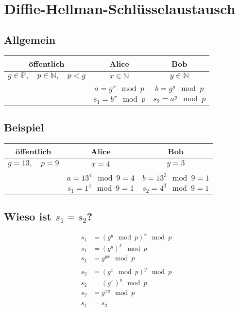 \documentclass[a4paper]{report}
\begin{document}
\chapter*{Diffie-Hellman-Schlüsselaustausch}
\section*{Allgemein}
\begin{center}
\begin{tabular}{c|c|c}
    öffentlich & Alice & Bob \\
    \hline
    $g\in\mathbb{P},\quad p\in\mathbb{N},\quad p<g$ &
    $x\in\mathbb{N}$ &
    $y\in\mathbb{N}$ \\ & & \\
    &
    $a=g^x \mod p$ &
    $b=g^y \mod p$ \\
    & $s_1=b^x \mod p$ & $s_2=a^y \mod p$
\end{tabular}
\end{center}

\section*{Beispiel}
\begin{center}
\begin{tabular}{c|c|c}
    öffentlich & Alice & Bob \\
    \hline
    $g=13,\quad p=9$ &
    $x=4$ &
    $y=3$ \\ & & \\
    &
    $a=13^4 \mod 9=4$ &
    $b=13^3 \mod 9=1$ \\
    & $s_1=1^4 \mod 9=1$ & $s_2=4^3 \mod 9=1$
\end{tabular}
\end{center}

\section*{Wieso ist $s_1=s_2$?}
\begin{align}
    s_1&=\left(g^y \mod p\right)^x \mod p \\
    s_1&=\left(g^y\right)^x \mod p \\
    s_1&=g^{yx} \mod p \\ \\
    s_2&=\left(g^x \mod p\right)^y \mod p \\
    s_2&=\left(g^x\right)^y \mod p \\
    s_2&=g^{xy} \mod p \\ \\
    s_1&=s_2
\end{align}
\end{document}
